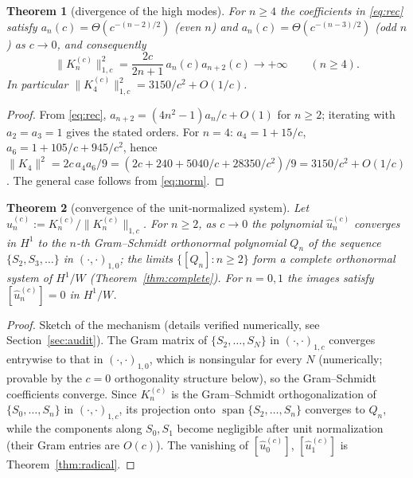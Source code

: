 ﻿\documentclass[11pt]{article}
\newtheorem{theorem}{Theorem}[section]
\begin{document}
\begin{theorem}[divergence of the high modes]\label{thm:high}
	For $n\ge 4$ the coefficients in \eqref{eq:rec} satisfy
	$a_n(c)=\Theta(c^{-(n-2)/2})$ (even $n$) and
	$a_n(c)=\Theta(c^{-(n-3)/2})$ (odd $n$) as $c\to 0$, and consequently
	\begin{equation*}
		\|K_n^{(c)}\|_{1,c}^2=\frac{2c}{2n+1}\,a_n(c)a_{n+2}(c)
		\to+\infty\qquad(n\ge 4).
	\end{equation*}
	In particular $\|K_4^{(c)}\|_{1,c}^2=3150/c^2+O(1/c)$.
\end{theorem}

\begin{proof}
	From \eqref{eq:rec}, $a_{n+2}=(4n^2-1)a_n/c+O(1)$ for $n\ge 2$; iterating
	with $a_2=a_3=1$ gives the stated orders.  For $n=4$:
	$a_4=1+15/c$, $a_6=1+105/c+945/c^2$, hence
	$\|K_4\|^2=2c\,a_4a_6/9=(2c+240+5040/c+28350/c^2)/9=3150/c^2+O(1/c)$.
	The general case follows from \eqref{eq:norm}.
\end{proof}

\begin{theorem}[convergence of the unit-normalized system]\label{thm:unit}
	Let $\widehat u_n^{(c)}:=K_n^{(c)}/\|K_n^{(c)}\|_{1,c}$.
	For $n\ge 2$, as $c\to 0$ the polynomial $\widehat u_n^{(c)}$ converges
	in $H^1$ to the $n$-th Gram--Schmidt orthonormal polynomial $Q_n$ of the
	sequence $\{S_2,S_3,\ldots\}$ in $(\cdot,\cdot)_{1,0}$; the limits
	$\{[Q_n]:n\ge 2\}$ form a complete orthonormal system of $H^1/W$
	(Theorem~\ref{thm:complete}).  For $n=0,1$ the images satisfy
	$[\widehat u_n^{(c)}]=0$ in $H^1/W$.
\end{theorem}

\begin{proof}
	Sketch of the mechanism (details verified numerically, see
	Section~\ref{sec:audit}).  The Gram matrix of $\{S_2,\ldots,S_N\}$ in
	$(\cdot,\cdot)_{1,c}$ converges entrywise to that in $(\cdot,\cdot)_{1,0}$,
	which is nonsingular for every $N$ (numerically; provable by the
	$c=0$ orthogonality structure below), so the Gram--Schmidt coefficients
	converge.  Since $K_n^{(c)}$ is the Gram--Schmidt orthogonalization of
	$\{S_0,\ldots,S_n\}$ in $(\cdot,\cdot)_{1,c}$, its projection onto
	$\operatorname{span}\{S_2,\ldots,S_n\}$ converges to $Q_n$, while the
	components along $S_0,S_1$ become negligible after unit normalization
	(their Gram entries are $O(c)$).  The vanishing of
	$[\widehat u_0^{(c)}]$, $[\widehat u_1^{(c)}]$ is
	Theorem~\ref{thm:radical}.
\end{proof}
\end{document}
